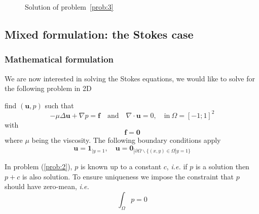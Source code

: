 \begin{figure}[htbp]
  \centering
  \caption{Solution of problem~\ref{prob:3}}
  \label{fig:2}
\end{figure}

\subsection{Mixed formulation: the Stokes case}
\label{sec:mixed-form-stok}
\subsubsection{Mathematical formulation}
\label{sec:math-form}

  We are now interested in solving
the Stokes equations, we would like to solve for the following problem
in 2D
\begin{problem}
\label{prob:4}
 find $(\mathbf{u},p)$ such that
\begin{equation}
  \label{eq:22}
  - \mu \Delta \mathbf{u} +\nabla p = \mathbf{f}\quad \text{and}\quad \nabla \cdot \mathbf{u} = 0,\quad \text{in}\ \Omega = [-1;1]^2
\end{equation}
with
\begin{equation}
  \label{eq:24}
  \mathbf{f} = \mathbf{0}
\end{equation}
where $\mu$ being the viscosity. The following boundary conditions apply
\begin{equation}
  \label{eq:23}
  \mathbf{u}=\mathbf{1}_{|y=1}, \quad \mathbf{u}=\mathbf{0}_{|\partial \Omega \backslash \{(x,y) \in \Omega | y=1\}}
\end{equation}
\end{problem}

In problem (\ref{prob:2}), $p$ is known up to a constant $c$,
\emph{i.e.} if $p$ is a solution then $p+c$ is also solution. To
ensure uniqueness we impose the constraint that $p$ should have
zero-mean, \emph{i.e.}
\begin{equation}
  \label{eq:26}
  \int_\Omega p = 0
\end{equation}

